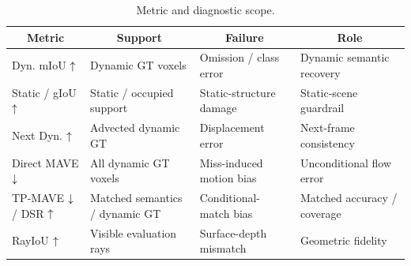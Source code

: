 \begin{table}[h]
  \belowrulesep=0pt
  \aboverulesep=0pt
  \centering
  \footnotesize
  \caption{Metric and diagnostic scope.}
  \label{tab:supp_metric_contract}
  \renewcommand{\arraystretch}{1.05}
  \setlength{\tabcolsep}{0pt}
  \begin{tabular*}{\textwidth}{@{\extracolsep{\fill}}llll@{}}
    \toprule[1.0pt]
    \multicolumn{1}{c}{Metric} & \multicolumn{1}{c}{Support} &
    \multicolumn{1}{c}{Failure} & \multicolumn{1}{c}{Role} \\
    \midrule
    Dyn. mIoU $\uparrow$ & Dynamic GT voxels & Omission / class error & Dynamic semantic recovery \\
    Static / gIoU $\uparrow$ & Static / occupied support & Static-structure damage & Static-scene guardrail \\
    Next Dyn. $\uparrow$ & Advected dynamic GT & Displacement error & Next-frame consistency \\
    Direct MAVE $\downarrow$ & All dynamic GT voxels & Miss-induced motion bias & Unconditional flow error \\
    TP-MAVE $\downarrow$ / DSR $\uparrow$ & Matched semantics / dynamic GT & Conditional-match bias & Matched accuracy / coverage \\
    RayIoU $\uparrow$ & Visible evaluation rays & Surface-depth mismatch & Geometric fidelity \\
    \bottomrule
  \end{tabular*}
\end{table}



